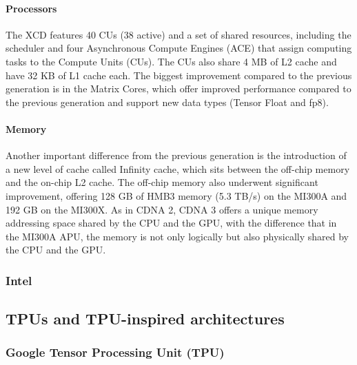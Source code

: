\documentclass[conference]{IEEEtran}
\begin{document}
\paragraph{Processors}
The XCD features 40 CUs (38 active) and a set of shared resources, including the scheduler and four Asynchronous Compute Engines (ACE) that assign computing tasks to the Compute Units (CUs). The CUs also share 4 MB of L2 cache and have 32 KB of L1 cache each.
The biggest improvement compared to the previous generation is in the Matrix Cores, which offer improved performance compared to the previous generation and support new data types (Tensor Float and fp8).
\paragraph{Memory}
Another important difference from the previous generation is the introduction of a new level of cache called Infinity cache, which sits between the off-chip memory and the on-chip L2 cache. The off-chip memory also underwent significant improvement, offering 128 GB of HMB3 memory (5.3 TB/s) on the MI300A and 192 GB on the MI300X. As in CDNA 2, CDNA 3 offers a unique memory addressing space shared by the CPU and the GPU, with the difference that in the MI300A APU, the memory is not only logically but also physically shared by the CPU and the GPU.

 
\subsubsection{Intel}

 
\subsection{TPUs and TPU-inspired architectures} \label{tpu}
\subsubsection{Google Tensor Processing Unit (TPU)} \label{TPU}
\end{document}
